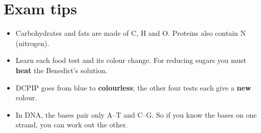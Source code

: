 \documentclass[11pt]{article}
\begin{document}
\section*{Exam tips}

\begin{itemize}
\item Carbohydrates and fats are made of C, H and O. Proteins also contain N (nitrogen).

\item Learn each food test and its colour change. For reducing sugars you must \textbf{heat} the Benedict's solution.

\item DCPIP goes from blue to \textbf{colourless}; the other four tests each give a \textbf{new} colour.

\item In DNA, the bases pair only A–T and C–G. So if you know the bases on one strand, you can work out the other.

\end{itemize}
\end{document}
